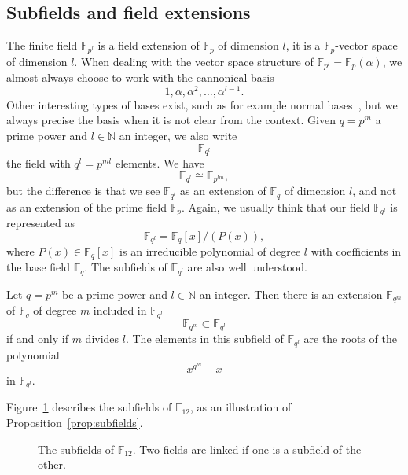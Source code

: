 \subsection{Subfields and field extensions}

The finite field $\mathbb{F}_{p^l}$ is a
field extension of $\mathbb{F}_{p}$ of dimension $l$, \ie it is a
$\mathbb{F}_{p}$-vector space of dimension $l$. When dealing with the vector
space structure of $\mathbb{F}_{p^l}=\mathbb{F}_{p}(\alpha)$, we almost always choose to work with the
cannonical basis 
\[
  1, \alpha, \alpha^2, \dots, \alpha^{l-1}.
\]
Other interesting types of bases exist, such as for example normal
bases~\cite{Gao93}, but we always precise the basis when it is not clear from
the context.
Given $q=p^m$ a prime power and
$l\in\mathbb{N}$ an integer, we also write 
\[
  \mathbb{F}_{q^l}
\]
the field with $q^l = p^{ml}$ elements. We have
\[
  \mathbb{F}_{q^l}\cong\mathbb{F}_{p^{lm}},
\]
but the difference is that we see $\mathbb{F}_{q^l}$ as an extension of
$\mathbb{F}_{q}$ of dimension $l$, and not as an extension of the prime field
$\mathbb{F}_p$. Again, we usually think that our field $\mathbb{F}_{q^l}$ is
represented as
\[
  \mathbb{F}_{q^l}=\mathbb{F}_q[x]/(P(x)),
\]
where $P(x)\in\mathbb{F}_{q}[x]$ is an irreducible polynomial of degree $l$ with
coefficients in the base field $\mathbb{F}_q$. The subfields of
$\mathbb{F}_{q^l}$ are also well understood.
\begin{prop}
  \label{prop:subfields}
  Let $q=p^m$ be a prime power and $l\in\mathbb{N}$ an integer. Then there is
  an extension $\mathbb{F}_{q^m}$ of $\mathbb{F}_q$ of degree $m$ 
  included in $\mathbb{F}_{q^l}$
  \[
    \mathbb{F}_{q^m}\subset\mathbb{F}_{q^l}
  \]
  if and only if $m$ divides
  $l$. The elements in this subfield of $\mathbb{F}_{q^l}$ are the roots of the
  polynomial
  \[
    x^{q^m}-x
  \]
  in $\mathbb{F}_{q^l}$.
\end{prop}
Figure~\ref{fig:F12} describes the subfields of $\mathbb{F}_{12}$, as an
illustration of Proposition~\ref{prop:subfields}.
\begin{figure}
  \centering
  \caption{The subfields of $\mathbb{F}_{12}$. Two fields are linked if one is a
subfield of the other.}
  \label{fig:F12}
\end{figure}
